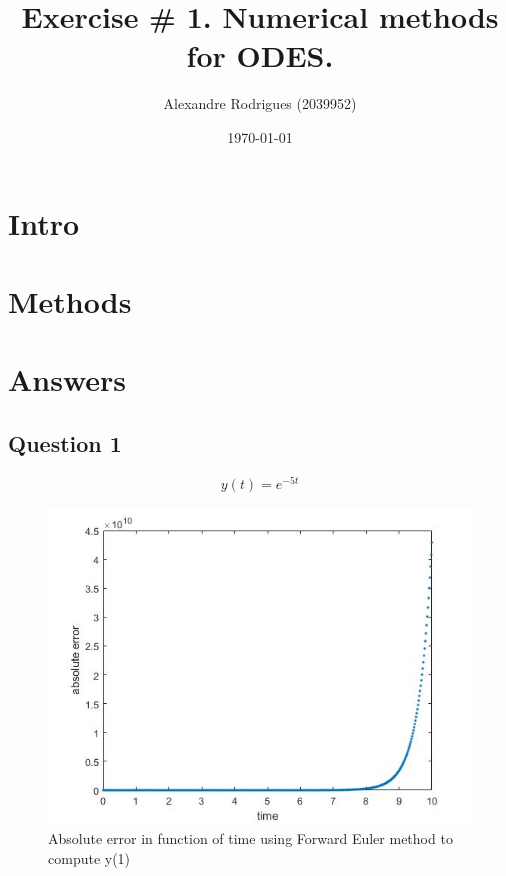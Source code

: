 \documentclass[a4paper, 11pt]{article}
\begin{document}
	
	\title{Exercise \# 1. Numerical methods for ODES. }
	\author{{\small Alexandre Rodrigues (2039952)}}
	\date{\today}
	
	\maketitle
	
	\section*{Intro}
	
	\section*{Methods}
	
	
	\section*{Answers}
	\subsection*{Question 1}
	
	\begin{equation}
		y(t) = e^{-5t}
	\end{equation}
	
	\begin{figure}[H]
		\centering
		\includegraphics[width=\linewidth]{ex1_fe.jpg}
		\caption{Absolute error in function of time using Forward Euler method to compute y(1)}
		\label{fig:ex1_fe}
	\end{figure}
	
\end{document}
